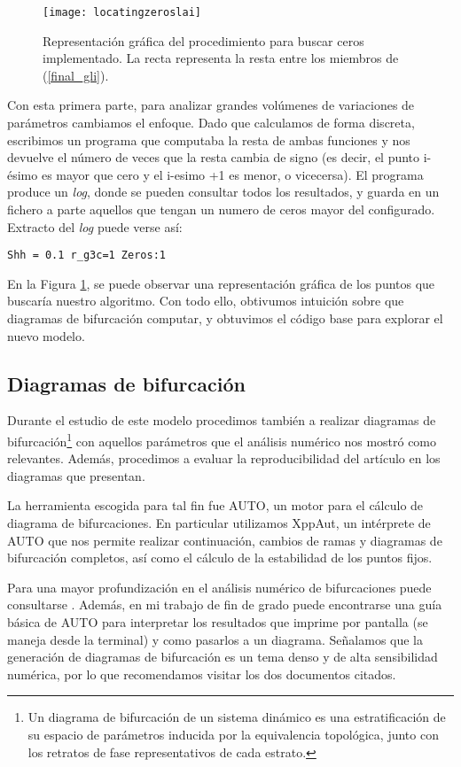 \begin{figure}[h]
	\texttt{[image: locatingzeroslai]}
	\centering
	\caption{Representación gráfica del procedimiento para buscar ceros implementado. La recta representa la resta entre los miembros de (\ref{final_gli}).}
	\label{lai_124}
\end{figure}


Con esta primera parte, para analizar grandes volúmenes de variaciones de parámetros cambiamos el enfoque. Dado que calculamos de forma discreta, escribimos un programa que computaba la resta de ambas funciones y nos devuelve el número de veces que la resta cambia de signo (es decir, el punto i-ésimo es mayor que cero y el i-esimo +1 es menor, o vicecersa).
El programa produce un \textit{log}, donde se pueden consultar todos los resultados, y guarda en un fichero a parte aquellos que tengan un numero de ceros mayor del configurado.
Extracto del \textit{log} puede verse así:
\begin{verbatim}
Shh = 0.1 r_g3c=1 Zeros:1
\end{verbatim}
En la Figura \ref{lai_124}, se puede observar una representación gráfica de los puntos que buscaría nuestro algoritmo.
Con todo ello, obtivumos intuición sobre que diagramas de bifurcación computar, y obtuvimos el código base para explorar el nuevo modelo.



\subsection{Diagramas de bifurcación}
Durante el estudio de este modelo procedimos también a realizar diagramas de bifurcación\footnote{Un diagrama de bifurcación de un sistema dinámico es una estratificación de su espacio de parámetros inducida por la equivalencia topológica, junto con los retratos de fase representativos de cada estrato.} con aquellos parámetros que el análisis numérico nos mostró como relevantes. Además, procedimos a evaluar la reproducibilidad del artículo en los diagramas que presentan. 

La herramienta escogida para tal fin  fue AUTO, un motor para el cálculo de diagrama de bifurcaciones. En particular utilizamos XppAut, un intérprete de AUTO que nos permite realizar continuación, cambios de ramas y diagramas de bifurcación completos, así como el cálculo de la estabilidad de los puntos fijos. 

Para una mayor profundización en el análisis numérico de bifurcaciones puede consultarse \cite{meijer2012numerical}. Además, en mi trabajo de fin de grado \cite{Yo} puede encontrarse una guía básica de AUTO para interpretar los resultados que imprime por pantalla (se maneja desde la terminal) y como pasarlos a un diagrama. Señalamos que la generación de diagramas de bifurcación es un tema denso y de alta sensibilidad numérica, por lo que recomendamos visitar los dos documentos citados. 

